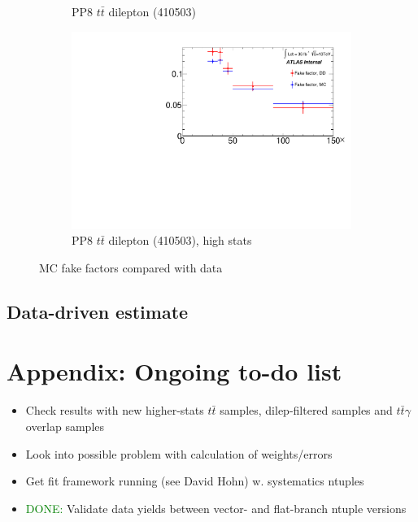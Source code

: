 \documentclass[11pt]{article}
\begin{document}
\begin{figure}[H]
\begin{subfigure}[b]{.5\textwidth}
			\caption{PP8 $t\bar{t}$ dilepton (410503)}
		\end{subfigure}
		\quad
		\begin{subfigure}[b]{.5\textwidth}
			\includegraphics[width=0.82\linewidth]{figures/FakesEstimate_data_pp8_dilepton_new/Overlay_FF_tau_pt_data.pdf}
			\caption{PP8 $t\bar{t}$ dilepton (410503), high stats}
		\end{subfigure}
		\caption{MC fake factors compared with data}
	\end{figure}

	\clearpage
	\subsection{Data-driven estimate} 
	
	\clearpage
	\section{Appendix: Ongoing to-do list} 
	\begin{itemize} 	
		\item Check results with new higher-stats $t\bar{t}$ samples, dilep-filtered samples and $t\bar{t}\gamma$ overlap samples
		\item Look into possible problem with calculation of weights/errors 
		\item Get fit framework running (see David Hohn) w. systematics ntuples 
		\item \textcolor{green}{DONE:} Validate data yields between vector- and flat-branch ntuple versions 
	\end{itemize} 
	
	
\end{document}
